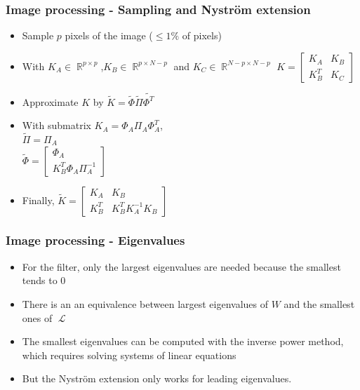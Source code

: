 \documentclass{beamer}
\DeclareMathOperator{\Lapl}{\mathcal{L}}
\DeclareMathOperator{\Real}{\mathbb{R}}
\begin{document}
\begin{frame}
 \frametitle{Image processing - Sampling and Nystr\"om extension}
 \begin{itemize}
  \item Sample \(p\) pixels of the image (\(\le 1\%\) of pixels)
  \item With \(K_A \in \Real^{p \times p}\),\(K_B \in \Real^{p \times N-p}\) and \(K_C \in \Real^{N-p \times N-p}\) \(K = \begin{bmatrix}K_A & K_B \\ K_B^T & K_C\end{bmatrix}\)
  \item Approximate \(K\) by \(\tilde{K} = \tilde{\Phi} \tilde{\Pi} \tilde{\Phi^T}\)
  \item With submatrix \(K_A = \Phi_A \Pi_A \Phi_A^T\), \\
   \(\tilde{\Pi} = \Pi_A\) \\
   \(\tilde{\Phi} = \begin{bmatrix}\Phi_A \\ K_B^T \Phi_A \Pi_A^{-1} \end{bmatrix}\)
  \item Finally, \(\tilde{K} = \begin{bmatrix} K_A & K_B \\ K_B^T & K_B^T K_A^{-1} K_B \end{bmatrix}\)
 \end{itemize}
\end{frame}

\begin{frame}
 \frametitle{Image processing - Eigenvalues}
 \begin{itemize}
  \item For the filter, only the largest eigenvalues are needed because the smallest tends to 0
  \item There is an an equivalence between largest eigenvalues of \(W\) and the smallest ones of \(\Lapl\)
  \item The smallest eigenvalues can be computed with the inverse power method, which requires solving systems of linear equations
  \item But the Nystr\"om extension only works for leading eigenvalues.
 \end{itemize}
\end{frame}
\end{document}
